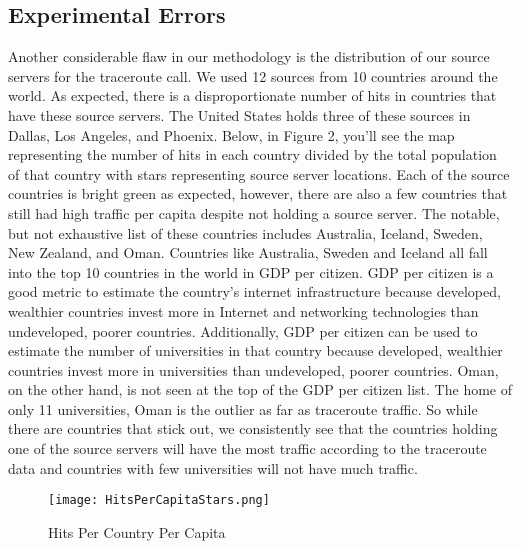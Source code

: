 \documentclass{sigcomm-alternate}
\begin{document}
\subsection{Experimental Errors}
	Another considerable flaw in our methodology is the distribution of our source servers for the traceroute call. We used 12 sources from 10 countries around the world. As expected, there is a disproportionate number of hits in countries that have these source servers. The United States holds three of these sources in Dallas, Los Angeles, and Phoenix. Below, in Figure 2, you’ll see the map representing the number of hits in each country divided by the total population of that country with stars representing source server locations. Each of the source countries is bright green as expected, however, there are also a few countries that still had high traffic per capita despite not holding a source server. The notable, but not exhaustive list of these countries includes Australia, Iceland, Sweden, New Zealand, and Oman. Countries like Australia, Sweden and Iceland all fall into the top 10 countries in the world in GDP per citizen. GDP per citizen is a good metric to estimate the country’s internet infrastructure because developed, wealthier countries invest more in Internet and networking technologies than undeveloped, poorer countries. Additionally, GDP per citizen can be used to estimate the number of universities in that country because developed, wealthier countries invest more in universities than undeveloped, poorer countries. Oman, on the other hand, is not seen at the top of the GDP per citizen list. The home of only 11 universities, Oman is the outlier as far as traceroute traffic. So while there are countries that stick out, we consistently see that the countries holding one of the source servers will have the most traffic according to the traceroute data and countries with few universities will not have much traffic. 

	
\begin{figure}[h!]
  \caption{Hits Per Country Per Capita}
  \centering
    \texttt{[image: HitsPerCapitaStars.png]}
\end{figure}
\end{document}
